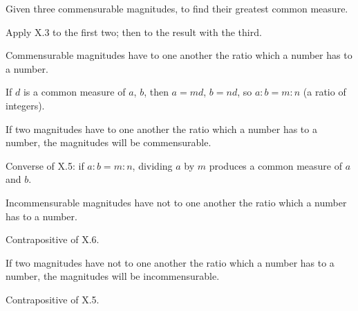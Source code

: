 \begin{claim}
\label{prop:X.4}
Given three commensurable magnitudes, to find their greatest common
measure.
\end{claim}
\begin{evidence}[Proof of X.4]
\label{ev:X.4}
Apply X.3 to the first two; then to the result with the third.
\end{evidence}

\begin{claim}
\label{prop:X.5}
Commensurable magnitudes have to one another the ratio which a number
has to a number.
\end{claim}
\begin{evidence}[Proof of X.5]
\label{ev:X.5}
If $d$ is a common measure of $a$, $b$, then $a = md$, $b = nd$, so
$a : b = m : n$ (a ratio of integers).
\end{evidence}

\begin{claim}
\label{prop:X.6}
If two magnitudes have to one another the ratio which a number has
to a number, the magnitudes will be commensurable.
\end{claim}
\begin{evidence}[Proof of X.6]
\label{ev:X.6}
Converse of X.5: if $a : b = m : n$, dividing $a$ by $m$ produces a
common measure of $a$ and $b$.
\end{evidence}

\begin{claim}
\label{prop:X.7}
Incommensurable magnitudes have not to one another the ratio which
a number has to a number.
\end{claim}
\begin{evidence}[Proof of X.7]
\label{ev:X.7}
Contrapositive of X.6.
\end{evidence}

\begin{claim}
\label{prop:X.8}
If two magnitudes have not to one another the ratio which a number
has to a number, the magnitudes will be incommensurable.
\end{claim}
\begin{evidence}[Proof of X.8]
\label{ev:X.8}
Contrapositive of X.5.
\end{evidence}


